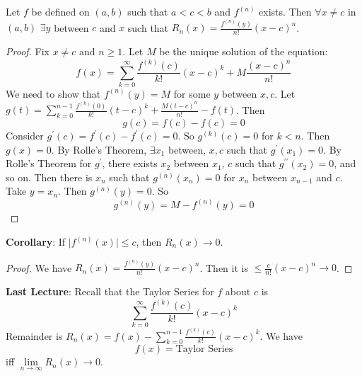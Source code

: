 \documentclass{report}
\begin{document}
\begin{theorem}{31.3}
    Let $f$ be defined on $(a, b)$ such that $a < c < b$ and $f^{(n)}$ exists. Then $\forall x \neq c$ in $(a, b)$ $\exists y$ between $c$ and $x$ such that $R_{n}(x) = \frac{f^{(n)}(y)}{n!}(x - c)^{n}$.
\end{theorem}
    \begin{proof}
        Fix $x \neq c$ and $n \geq 1$. Let $M$ be the unique solution of the equation:
            \begin{equation*}
                f(x) = \sum_{k = 0}^{\infty} \dfrac{f^{(k)}(c)}{k!}(x - c)^{k} + M\dfrac{(x - c)^{n}}{n!}
            \end{equation*}
        We need to show that $f^{(n)}(y) = M$ for some $y$ between $x, c$. Let $g(t) = \sum_{k = 0}^{n - 1}\frac{f^{(k)}(0)}{k!}(t - c)^{k} + \frac{M(t - c)^{n}}{n!} - f(t)$. Then
            \begin{equation*}
                g(c) = f(c) - f(c) = 0
            \end{equation*}
        Consider $g^{\prime}(c) = f^{\prime}(c) - f^{\prime}(c) = 0$. So $g^{(k)}(c) = 0$ for $k < n$. Then $g(x) = 0$. By Rolle's Theorem, $\exists x_{1}$ between, $x, c$ such that $g^{\prime}(x_{1}) = 0$. By Rolle's Theorem for $g^{\prime}$, there exists $x_{2}$ between $x_{1}$, $c$ such that $g^{\prime\prime}(x_{2}) = 0$, and so on. Then there is $x_{n}$ such that $g^{(n)}(x_{n}) = 0$ for $x_{n}$ between $x_{n - 1}$ and $c$. Take $y = x_{n}$. Then $g^{(n)}(y) = 0$. So 
            \begin{equation*}
                g^{(n)}(y) = M - f^{(n)}(y) = 0
            \end{equation*}
    \end{proof}

\textbf{Corollary}: If $\lvert f^{(n)}(x) \rvert \leq c$, then $R_{n}(x) \rightarrow 0$.
    \begin{proof}
        We have $R_{n}(x) = \frac{f^{(n)}(y)}{n!}(x - c)^{n}$. Then it is $\leq \frac{c}{n!}(x - c)^{n} \rightarrow 0$.
    \end{proof}

\textbf{Last Lecture}: Recall that the Taylor Series for $f$ about $c$ is
    \begin{equation*}
        \sum_{k = 0}^{\infty}\dfrac{f^{(k)}(c)}{k!}(x - c)^{k}
    \end{equation*}
Remainder is $R_{n}(x) = f(x) - \sum_{k = 0}^{n - 1}\frac{f^{(k)}(c)}{k!}(x - c)^{k}$. We have
    \begin{equation*}
        f(x) = \text{Taylor Series}
    \end{equation*}
iff $\lim\limits_{n \to \infty} R_{n}(x) \rightarrow 0$.
\end{document}
